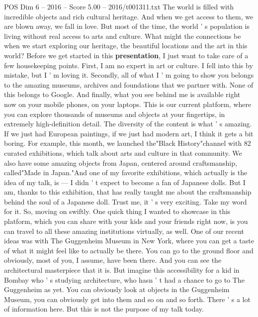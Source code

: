 \begin{textsample}{POS Dim 6 – 2016 – Score 5.00 – 2016/t001311.txt}  \label{ex:f6_pos_044}
The world is filled with incredible objects and rich cultural heritage.
And when we get access to them, we are blown away, we fall in love.
But most of the time, the world ' s population is living without real access to arts and culture.
What might the connections be when we start exploring our heritage, the beautiful locations and the art in this world?
Before we get started in this \textbf{presentation}, I just want to take care of a few housekeeping points.
First, I am no expert in art or culture.
I fell into this by mistake, but I ' m loving it.
Secondly, all of what I ' m going to show you belongs to the amazing museums, archives and foundations that we partner with.
None of this belongs to Google.
And finally, what you see behind me is available right now on your mobile phones, on your laptops.
This is our current platform, where you can explore thousands of museums and objects at your fingertips, in extremely high-definition detail.
The diversity of the content is what ' s amazing.
If we just had European paintings, if we just had modern art, I think it gets a bit boring.
For example, this month, we launched the"Black History"channel with 82 curated exhibitions, which talk about arts and culture in that community.
We also have some amazing objects from Japan, centered around craftsmanship, called"Made in Japan."And one of my favorite exhibitions, which actually is the idea of my talk, is — I didn ' t expect to become a fan of Japanese dolls.
But I am, thanks to this exhibition, that has really taught me about the craftsmanship behind the soul of a Japanese doll.
Trust me, it ' s very exciting.
Take my word for it.
So, moving on swiftly.
One quick thing I wanted to showcase in this platform, which you can share with your kids and your friends right now, is you can travel to all these amazing institutions virtually, as well.
One of our recent ideas was with The Guggenheim Museum in New York, where you can get a taste of what it might feel like to actually be there.
You can go to the ground floor and obviously, most of you, I assume, have been there.
And you can see the architectural masterpiece that it is.
But imagine this accessibility for a kid in Bombay who ' s studying architecture, who hasn ' t had a chance to go to The Guggenheim as yet.
You can obviously look at objects in the Guggenheim Museum, you can obviously get into them and so on and so forth.
There ' s a lot of information here.
But this is not the purpose of my talk today.

\end{textsample}
